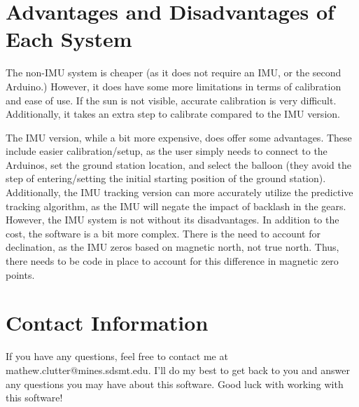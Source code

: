 \documentclass{article}
\begin{document}
\section{Advantages and Disadvantages of Each System}
The non-IMU system is cheaper (as it does not require an IMU, or the second Arduino.) However, it does have some more limitations in terms of calibration and ease of use. If the sun is not visible, accurate calibration is very difficult. Additionally, it takes an extra step to calibrate compared to the IMU version. 

The IMU version, while a bit more expensive, does offer some advantages. These include easier calibration/setup, as the user simply needs to connect to the Arduinos, set the ground station location, and select the balloon (they avoid the step of entering/setting the initial starting position of the ground station). Additionally, the IMU tracking version can more accurately utilize the predictive tracking algorithm, as the IMU will negate the impact of backlash in the gears. However, the IMU system is not without its disadvantages. In addition to the cost, the software is a bit more complex. There is the need to account for declination, as the IMU zeros based on magnetic north, not true north. Thus, there needs to be code in place to account for this difference in magnetic zero points. 


\section{Contact Information}
If you have any questions, feel free to contact me at mathew.clutter@mines.sdsmt.edu. I'll do my best to get back to you and answer any questions you may have about this software. Good luck with working with this software!
\end{document}
